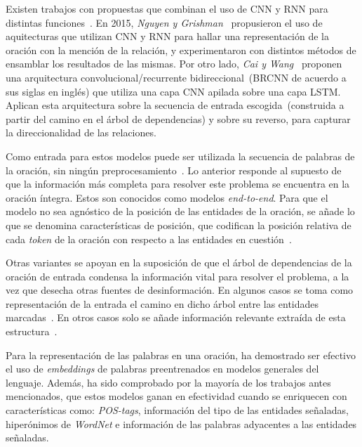 Existen trabajos con propuestas que combinan el uso de CNN y RNN para distintas funciones~\cite{liu2015dependency, nguyen2015combining, cai2016bidirectional}.
En 2015, \textit{Nguyen y Grishman}~\cite{nguyen2015combining} propusieron el uso de aquitecturas que utilizan CNN y RNN para hallar una representación de la oración con la mención de la relación, y experimentaron con distintos métodos de ensamblar los resultados de las mismas.
Por otro lado, \textit{Cai y Wang}~\cite{cai2016bidirectional} proponen una arquitectura convolucional/recurrente bidireccional~(BRCNN de acuerdo a sus siglas en inglés) que utiliza una capa CNN apilada sobre una capa LSTM.
Aplican esta arquitectura sobre la secuencia de entrada escogida~(construida a partir del camino en el árbol de dependencias) y sobre su reverso, para capturar la direccionalidad de las relaciones.

Como entrada para estos modelos puede ser utilizada la secuencia de palabras de la oración, sin ningún preprocesamiento~\cite{zeng2014relation, santos2015classifying, nguyen2015relation, huang2016attention, wang2016relation, xiao2016semantic}.
Lo anterior responde al supuesto de que la información más completa para resolver este problema se encuentra en la oración íntegra.
Estos son conocidos como modelos \textit{end-to-end}.
Para que el modelo no sea agnóstico de la posición de las entidades de la oración, se añade lo que se denomina características de posición, que codifican la posición relativa de cada \textit{token} de la oración con respecto a las entidades en cuestión~\cite{zeng2014relation, santos2015classifying, nguyen2015relation, zhang2015bidirectional,nguyen2015combining,huang2016attention, wang2016relation, xiao2016semantic, lee2019semantic}.

Otras variantes se apoyan en la suposición de que el árbol de dependencias de la oración de entrada condensa la información vital para resolver el problema, a la vez que desecha otras fuentes de desinformación.
En algunos casos se toma como representación de la entrada el camino en dicho árbol entre las entidades marcadas~\cite{socher2012semantic, xu2015classifying, hashimoto2015task, xu2015semantic, liu2015dependency, ebrahimi2015chain}.
En otros casos solo se añade información relevante extraída de esta estructura~\cite{zhang2015bidirectional}.

Para la representación de las palabras en una oración, ha demostrado ser efectivo el uso de \textit{embeddings} de palabras preentrenados en modelos generales del lenguaje.
Además, ha sido comprobado por la mayoría de los trabajos antes mencionados, que estos modelos ganan en efectividad cuando se enriquecen con características como: \textit{POS-tags}, información del tipo de las entidades señaladas, hiperónimos de \textit{WordNet} e información de las palabras adyacentes a las entidades señaladas.

